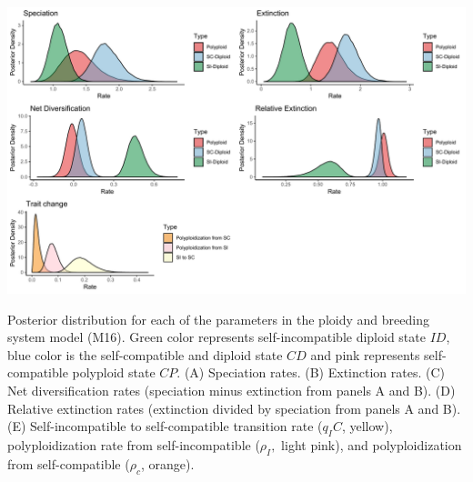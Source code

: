 \begin{suppfigure}
\includegraphics[width=\textwidth]{figS7.pdf}
\caption{Posterior distribution for each of the parameters in the ploidy and breeding system model (M16). Green color represents self-incompatible diploid state $ID$, blue color is the self-compatible and diploid state $CD$ and pink represents self-compatible polyploid state $CP$.  (A) Speciation rates. (B) Extinction rates. (C) Net diversification rates (speciation minus extinction from panels A and B). (D) Relative extinction rates (extinction divided by speciation from panels A and B). (E) Self-incompatible to self-compatible transition rate ($q_IC$, yellow), polyploidization rate from self-incompatible ($\rho_I,$ light pink), and polyploidization from self-compatible ($\rho_c$, orange).} %
\label{suppfigure:IDCDCPnodip}
\end{suppfigure}

